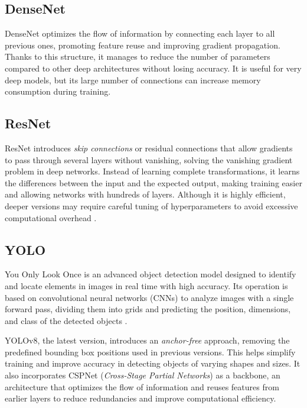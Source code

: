 \subsection{DenseNet}
\label{subsec:densenet}

DenseNet optimizes the flow of information by connecting each layer to all previous ones,
promoting feature reuse and improving gradient propagation.
Thanks to this structure, it manages to reduce the number of parameters compared to other deep architectures without
losing accuracy.
It is useful for very deep models, but its large number of connections can increase memory consumption during training.

\subsection{ResNet}
\label{subsec:resnet}

ResNet introduces \textit{skip connections} or residual connections that allow gradients
to pass through several layers without vanishing, solving the vanishing gradient problem
in deep networks.
Instead of learning complete transformations, it learns the differences between the input
and the expected output, making training easier and allowing networks with hundreds of layers.
Although it is highly efficient, deeper versions may require careful tuning of hyperparameters
to avoid excessive computational overhead \cite{sathishkumar_forest_2023}.

\subsection{YOLO}
\label{subsec:yolo}

You Only Look Once is an advanced object detection model designed to identify and locate
elements in images in real time with high accuracy.
Its operation is based on convolutional neural networks (CNNs) to analyze images
with a single forward pass, dividing them into grids and predicting the position,
dimensions, and class of the detected objects \cite{yaseen2024yolov8indepthexplorationinternal}.

YOLOv8, the latest version, introduces an \textit{anchor-free} approach, removing the
predefined bounding box positions used in previous versions.
This helps simplify training and improve accuracy in detecting objects of varying shapes and sizes.
It also incorporates CSPNet (\textit{Cross-Stage Partial Networks}) as a backbone, an architecture that optimizes
the flow of information and reuses features from earlier layers to reduce redundancies
and improve computational efficiency.

